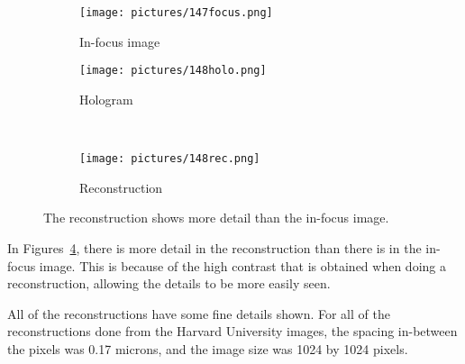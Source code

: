 \begin{figure}[ht!]
    \begin{center}

        \begin{subfigure}[t]{0.4\textwidth}
            \label{fig:147focus}
            \texttt{[image: pictures/147focus.png]}
            \caption{In-focus image}
        \end{subfigure}
        \begin{subfigure}[t]{0.4\textwidth}
            \label{fig:148holo}
            \texttt{[image: pictures/148holo.png]}
            \caption{Hologram}
        \end{subfigure}
        \\
        \begin{subfigure}[t]{\textwidth}
            \label{fig:148rec}
            \texttt{[image: pictures/148rec.png]}
            \caption{Reconstruction}
        \end{subfigure}


    \end{center}
    \caption{%
        The reconstruction shows more detail than the in-focus image.
    }%
    \label{fig:148}
\end{figure}

In Figures~\ref{fig:148}, there is more detail in the reconstruction than there
is in the in-focus image. This is because of the high contrast that is obtained
when doing a reconstruction, allowing the details to be more easily seen.

All of the reconstructions have some fine details shown. For all of the
reconstructions done from the Harvard University images, the spacing in-between
the pixels was 0.17 microns, and the image size was 1024 by 1024 pixels.









%
